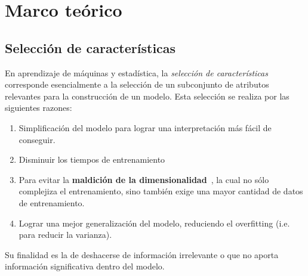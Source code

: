 \section{Marco te\'orico}\label{sec2}
\subsection{Selecci\'on de caracter\'isticas}
En aprendizaje de m\'aquinas y estad\'istica, la \textit{selecci\'on de caracter\'isticas} corresponde esencialmente a la selecci\'on de un subconjunto de atributos relevantes para la construcci\'on de un modelo. Esta selecci\'on se realiza por las siguientes razones:
\begin{enumerate}
\item Simplificaci\'on del modelo para lograr una interpretaci\'on m\'as f\'acil de conseguir.
\item Disminuir los tiempos de entrenamiento
\item Para evitar la \textbf{maldici\'on de la dimensionalidad}~\cite{bellman}, la cual no s\'olo complejiza el entrenamiento, sino tambi\'en exige una mayor cantidad de datos de entrenamiento.
\item Lograr una mejor generalizaci\'on del modelo, reduciendo el overfitting (i.e. para reducir la varianza).
\end{enumerate}

Su finalidad es la de deshacerse de informaci\'on irrelevante o que no aporta informaci\'on significativa dentro del modelo. 
